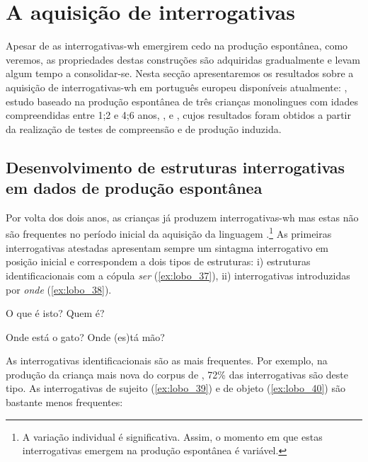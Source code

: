 \documentclass[output=paper]{LSP/langsci}
\begin{document}
\section{A aquisição de interrogativas}
\label{sec:lobo_aquisicao_interrogativas}

Apesar de as interrogativas-wh emergirem cedo na produção espontânea, como veremos, as propriedades destas construções são adquiridas gradualmente e levam algum tempo a consolidar-se. Nesta secção apresentaremos os resultados sobre a aquisição de interrogativas-wh em português europeu disponíveis atualmente: \citet{soares2003,soares2004,soares2006}, estudo baseado na produção espontânea de três crianças monolingues com idades compreendidas entre 1;2 e 4;6 anos, \citet{cerejeira2009,cerejeira2010}, \citet{baiao2013} e \citet{baiaolobo2014}, cujos resultados foram obtidos a partir da realização de testes de compreensão e de produção induzida.


\subsection{Desenvolvimento de estruturas interrogativas em dados de produção espontânea}
\label{subsec:lobo_desenvolvimento}

Por volta dos dois anos, as crianças já produzem interrogativas-wh mas estas não são frequentes no período inicial da aquisição da linguagem \citep{soares2006}.\footnote{ A variação individual é significativa. Assim, o momento em que estas interrogativas emergem na produção espontânea é variável.} As primeiras interrogativas atestadas apresentam sempre um sintagma interrogativo em posição inicial e correspondem a dois tipos de estruturas: i) estruturas identificacionais com a cópula \textit{ser} (\ref{ex:lobo_37}), ii) interrogativas introduzidas por \textit{onde} (\ref{ex:lobo_38}).

\ea\label{ex:lobo_37}
\ea\label{ex:lobo_37a} O que é isto?
\ex\label{ex:lobo_37b} Quem é?
\zl

\ea\label{ex:lobo_38}
\ea\label{ex:lobo_38a} Onde está o gato?
\ex\label{ex:lobo_38b} Onde (es)tá mão?
\zl

As interrogativas identificacionais são as mais frequentes. Por exemplo, na produção da criança mais nova do corpus de \citet{soares2006}, 72\% das interrogativas são deste tipo. As interrogativas de sujeito (\ref{ex:lobo_39}) e de objeto (\ref{ex:lobo_40}) são bastante menos frequentes:
\end{document}
